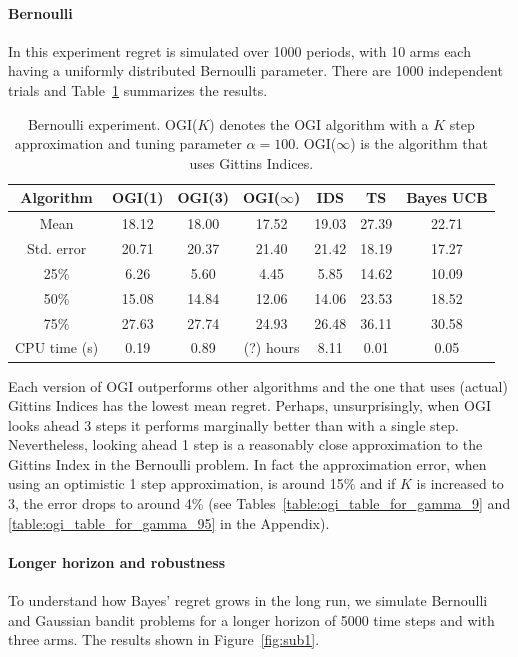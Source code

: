 \paragraph{Bernoulli}
In this experiment regret is simulated over 1000 periods, with 10 arms each having a uniformly distributed Bernoulli parameter. There are 1000 independent trials and Table~\ref{table:bernoulli_experiment1} summarizes the results.

\begin{table}[h!]
	\centering
	\begin{tabular}{ccccccc} \toprule
		\textbf{Algorithm} & \textbf{OGI(1)} & \textbf{OGI(3)} &  \textbf{OGI($\infty$)} & \textbf{IDS} & \textbf{TS} & \textbf{Bayes UCB}  \\ \midrule
		Mean &  18.12 & 18.00 & 17.52 & 19.03 & 27.39 & 22.71 \\ 
		Std. error & 20.71 & 20.37 &  21.40 & 21.42 & 18.19 & 17.27 \\ 
		25\% & 6.26 & 5.60 & 4.45 & 5.85 & 14.62 & 10.09 \\
		50\% & 15.08 & 14.84 &12.06 & 14.06 & 23.53 & 18.52 \\
		75\% & 27.63 & 27.74 & 24.93 & 26.48 & 36.11 & 30.58 \\
		CPU time (s) & 0.19 & 0.89 & (?) hours & 8.11 & 0.01 & 0.05  \\ \bottomrule
	\end{tabular}
	\caption[Table caption text]{Bernoulli experiment. OGI($K$) denotes the OGI algorithm with a $K$ step approximation and tuning parameter $\alpha = 100$. OGI($\infty$) is the algorithm that uses Gittins Indices.}
	\label{table:bernoulli_experiment1}
\end{table}
Each version of OGI outperforms other algorithms and the one that uses (actual) Gittins Indices has the lowest mean regret. Perhaps, unsurprisingly, when OGI  looks ahead 3 steps it performs marginally better than with a single step. Nevertheless, looking ahead 1 step is a reasonably close approximation to the Gittins Index in the Bernoulli problem. In fact the approximation error, when using an optimistic 1 step approximation, is around 15\% and if $K$ is increased to 3, the error drops to around 4\% (see Tables~\ref{table:ogi_table_for_gamma_9} and \ref{table:ogi_table_for_gamma_95} in the Appendix).


\paragraph{Longer horizon and robustness}
To understand how Bayes' regret grows in the long run, we simulate Bernoulli and Gaussian bandit problems for a longer horizon of 5000 time steps and with three arms. The results shown in Figure~\ref{fig:sub1}.

